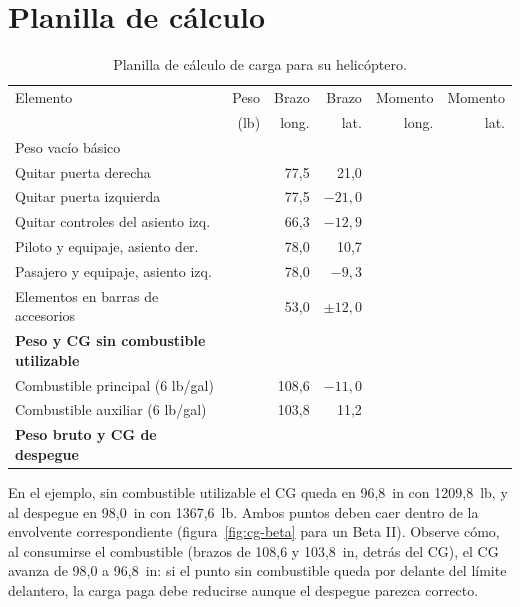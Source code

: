 \section{Planilla de cálculo}

\begin{table}[htbp]
\centering\footnotesize
\caption{Planilla de cálculo de carga para su helicóptero.}
\setlength{\tabcolsep}{3pt}
\renewcommand{\arraystretch}{1.5}
\begin{tabularx}{\linewidth}{@{}Yrrrrr@{}}
\toprule
Elemento & Peso & Brazo & Brazo & Momento & Momento \\
 & (lb) & long. & lat. & long. & lat. \\
\midrule
Peso vacío básico & \hrulefill & \hrulefill & \hrulefill & \hrulefill & \hrulefill \\
Quitar puerta derecha & \hrulefill & 77,5 & 21,0 & \hrulefill & \hrulefill \\
Quitar puerta izquierda & \hrulefill & 77,5 & $-21,0$ & \hrulefill & \hrulefill \\
Quitar controles del asiento izq. & \hrulefill & 66,3 & $-12,9$ & \hrulefill & \hrulefill \\
Piloto y equipaje, asiento der. & \hrulefill & 78,0 & 10,7 & \hrulefill & \hrulefill \\
Pasajero y equipaje, asiento izq. & \hrulefill & 78,0 & $-9,3$ & \hrulefill & \hrulefill \\
Elementos en barras de accesorios & \hrulefill & 53,0 & $\pm 12,0$ & \hrulefill & \hrulefill \\
\textbf{Peso y CG sin combustible utilizable} & \hrulefill & \hrulefill & \hrulefill & \hrulefill & \hrulefill \\
Combustible principal (6 lb/gal) & \hrulefill & 108,6 & $-11,0$ & \hrulefill & \hrulefill \\
Combustible auxiliar (6 lb/gal) & \hrulefill & 103,8 & 11,2 & \hrulefill & \hrulefill \\
\textbf{Peso bruto y CG de despegue} & \hrulefill & \hrulefill & \hrulefill & \hrulefill & \hrulefill \\
\bottomrule
\end{tabularx}
\end{table}

\begin{insightbox}
En el ejemplo, sin combustible utilizable el CG queda en 96,8~in con 1209,8~lb, y al despegue en 98,0~in con 1367,6~lb. Ambos puntos deben caer dentro de la envolvente correspondiente (figura~\ref{fig:cg-beta} para un Beta II). Observe cómo, al consumirse el combustible (brazos de 108,6 y 103,8~in, detrás del CG), el CG avanza de 98,0 a 96,8~in: si el punto sin combustible queda por delante del límite delantero, la carga paga debe reducirse aunque el despegue parezca correcto.
\end{insightbox}
